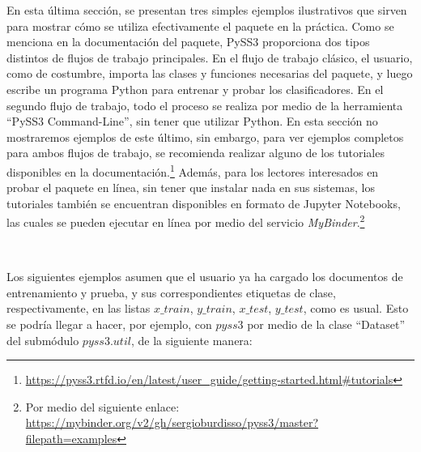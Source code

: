 En esta última sección, se presentan tres simples ejemplos ilustrativos que sirven para mostrar cómo se utiliza efectivamente el paquete en la práctica.
Como se menciona en la documentación del paquete, PySS3 proporciona dos tipos distintos de flujos de trabajo principales.
En el flujo de trabajo clásico, el usuario, como de costumbre, importa las clases y funciones necesarias del paquete, y luego escribe un programa Python para entrenar y probar los clasificadores. En el segundo flujo de trabajo, todo el proceso se realiza por medio de la herramienta ``PySS3 Command-Line'', sin tener que utilizar Python.
En esta sección no mostraremos ejemplos de este último, 
sin embargo, para ver ejemplos completos para ambos flujos de trabajo, se recomienda realizar alguno de los tutoriales disponibles en la documentación.\footnote{\url{https://pyss3.rtfd.io/en/latest/user_guide/getting-started.html\#tutorials}}
Además, para los lectores interesados en probar el paquete en línea, sin tener que instalar nada en sus sistemas, los tutoriales también se encuentran disponibles en formato de Jupyter Notebooks, las cuales se pueden ejecutar en línea por medio del servicio \emph{MyBinder}.\footnote{Por medio del siguiente enlace: \url{https://mybinder.org/v2/gh/sergioburdisso/pyss3/master?filepath=examples}}

\

Los siguientes ejemplos asumen que el usuario ya ha cargado los documentos de entrenamiento y prueba, y sus correspondientes etiquetas de clase, respectivamente, en las listas $x\_train$, $y\_train$, $x\_test$, $y\_test$, como es usual. Esto se podría llegar a hacer, por ejemplo, con $pyss3$ por medio de la clase ``Dataset'' del submódulo $pyss3.util$, de la siguiente manera:

